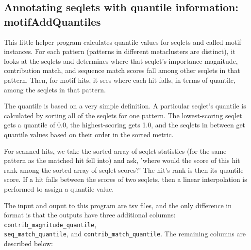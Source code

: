 \documentclass{article}
\begin{document}
\newpage


\subsection{Annotating seqlets with quantile information: {motifAddQuantiles}}\label{prog:motifAddQuantiles}

This little helper program calculates quantile values for seqlets and called
motif instances.
For each pattern (patterns in different metaclusters are distinct), it looks at
the seqlets and determines where that seqlet's importance magnitude,
contribution match, and sequence match scores fall among other seqlets in that
pattern.
Then, for motif hits, it sees where each hit falls, in terms of quantile, among
the seqlets in that pattern.

The quantile is based on a very simple definition.
A particular seqlet's quantile is calculated by sorting all of the seqlets for
one pattern.
The lowest-scoring seqlet gets a quantile of 0.0, the highest-scoring gets 1.0,
and the seqlets in between get quantile values based on their order in the
sorted metric.

For scanned hits, we take the sorted array of seqlet statistics (for the same
pattern as the matched hit fell into) and ask, 'where would the score of this
hit rank among the sorted array of seqlet scores?'
The hit's rank is then its quantile score.
If a hit falls between the scores of two seqlets, then a linear interpolation
is performed to assign a quantile value.

The input and ouput to this program are tsv files, and the only difference in
format is that the outputs have three additional columns:
\texttt{contrib\_magnitude\_quantile},\\ \texttt{seq\_match\_quantile}, and
\texttt{contrib\_match\_quantile}.
The remaining columns are described below:
\end{document}
